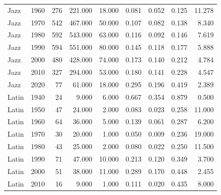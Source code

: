 \begin{table}
{\begin{tabular}{lrrrrrrrr}
                  Jazz &           1960 &        276 &  221.000 &   18.000 &        0.081 &  0.052 &  0.125 &                 11.278 \\
                  Jazz &           1970 &        542 &  467.000 &   50.000 &        0.107 &  0.082 &  0.138 &                  8.340 \\
                  Jazz &           1980 &        592 &  543.000 &   63.000 &        0.116 &  0.092 &  0.146 &                  7.619 \\
                  Jazz &           1990 &        594 &  551.000 &   80.000 &        0.145 &  0.118 &  0.177 &                  5.888 \\
                  Jazz &           2000 &        480 &  428.000 &   74.000 &        0.173 &  0.140 &  0.212 &                  4.784 \\
                  Jazz &           2010 &        327 &  294.000 &   53.000 &        0.180 &  0.141 &  0.228 &                  4.547 \\
                  Jazz &           2020 &         77 &   61.000 &   18.000 &        0.295 &  0.196 &  0.419 &                  2.389 \\
                 Latin &           1940 &         24 &    9.000 &    6.000 &        0.667 &  0.354 &  0.879 &                  0.500 \\
                 Latin &           1950 &         47 &   24.000 &    2.000 &        0.083 &  0.023 &  0.258 &                 11.000 \\
                 Latin &           1960 &         64 &   36.000 &    5.000 &        0.139 &  0.061 &  0.287 &                  6.200 \\
                 Latin &           1970 &         30 &   20.000 &    1.000 &        0.050 &  0.009 &  0.236 &                 19.000 \\
                 Latin &           1980 &         43 &   25.000 &    2.000 &        0.080 &  0.022 &  0.250 &                 11.500 \\
                 Latin &           1990 &         71 &   47.000 &   10.000 &        0.213 &  0.120 &  0.349 &                  3.700 \\
                 Latin &           2000 &         51 &   38.000 &   11.000 &        0.289 &  0.170 &  0.448 &                  2.455 \\
                 Latin &           2010 &         16 &    9.000 &    1.000 &        0.111 &  0.020 &  0.435 &                  8.000 \\

\end{tabular}}
\end{table}
